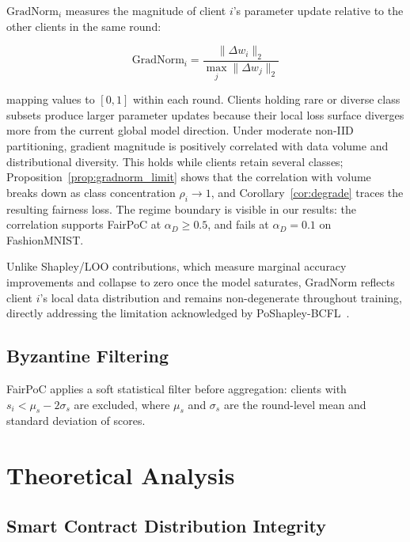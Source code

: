 \documentclass[conference]{IEEEtran}
\theoremstyle{remark}
\begin{document}
$\mathrm{GradNorm}_i$ measures the magnitude of client $i$'s parameter
update relative to the other clients in the same round:

\begin{equation}
  \mathrm{GradNorm}_i
    = \frac{\|\Delta w_i\|_2}{\max_j \|\Delta w_j\|_2}
  \label{eq:gradnorm}
\end{equation}

mapping values to $[0,1]$ within each round.
Clients holding rare or diverse class subsets produce larger parameter
updates because their local loss surface diverges more from the current
global model direction.
Under moderate non-IID partitioning, gradient magnitude is positively
correlated with data volume and distributional diversity. This holds
while clients retain several classes; Proposition~\ref{prop:gradnorm_limit}
shows that the correlation with volume breaks down as class
concentration $\rho_i \to 1$, and Corollary~\ref{cor:degrade} traces the
resulting fairness loss. The regime boundary is visible in our results:
the correlation supports FairPoC at $\alpha_D \geq 0.5$, and fails at
$\alpha_D = 0.1$ on FashionMNIST.

Unlike Shapley/LOO contributions, which measure marginal accuracy
improvements and collapse to zero once the model saturates,
$\mathrm{GradNorm}$ reflects client $i$'s local data distribution and
remains non-degenerate throughout training, directly addressing the
limitation acknowledged by PoShapley-BCFL~\cite{poshapley2023}.

\subsection{Byzantine Filtering}

FairPoC applies a soft statistical filter before aggregation: clients
with $s_i < \mu_s - 2\sigma_s$ are excluded, where $\mu_s$ and
$\sigma_s$ are the round-level mean and standard deviation of scores.

\section{Theoretical Analysis}
\label{sec:theory}

\subsection{Smart Contract Distribution Integrity}
\end{document}
